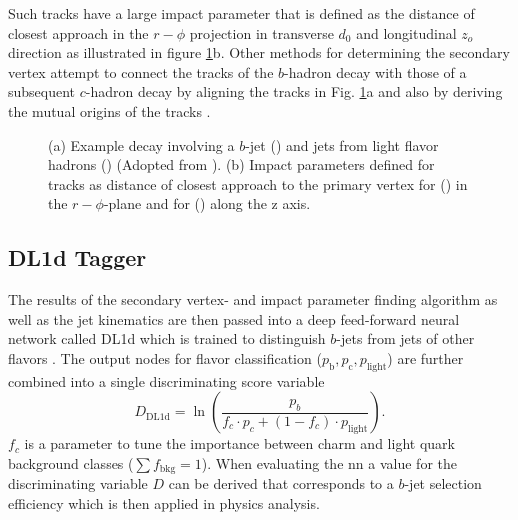 Such tracks have a large impact parameter that is defined as the distance of closest approach in the $r-\phi$ projection in transverse $d_0$ and longitudinal $z_o$ direction \citep{aad2008atlas} as illustrated in figure \ref{fig:secondary_vertex}b. Other methods for determining the secondary vertex attempt to connect the tracks of the $b$-hadron decay with those of a subsequent $c$-hadron decay by aligning the tracks in Fig. \ref{fig:secondary_vertex}a and also by deriving the mutual origins of the tracks \citep{ATL-PHYS-PUB-2017-013}.
\begin{figure}[]
  \centering
  \caption{(a) Example decay involving a $b$-jet () and jets from light flavor hadrons () (Adopted from \cite{Guth:2765038}). (b) Impact parameters defined for tracks as distance of closest approach to the primary vertex for (\mbox{\color[HTML]{009245}{$d_0$}}) in the $r-\phi$-plane and for (\mbox{\color[HTML]{EC1C25}{$z_0$}}) along the z axis.}
  \label{fig:secondary_vertex}
\end{figure}

\subsection{DL1d Tagger}
The results of the secondary vertex- and impact parameter finding algorithm as well as the jet kinematics are then passed into a deep feed-forward neural network called DL1d which is trained to distinguish $b$-jets from jets of other flavors \citep{atlas2022atlas}. The output nodes for flavor classification ($p_\mathrm{b}, p_\mathrm{c}, p_\mathrm{light}$) are further combined into a single discriminating score variable
\begin{equation}
  D_\mathrm{DL1d}=\ln\left(\frac{p_b}{f_c \cdot p_c + (1-f_c)\cdot p_\mathrm{light} }\right).
\end{equation}
$f_c$ is a parameter to tune the importance between charm and light quark background classes ($\sum f_\mathrm{bkg} =1$). When evaluating the \ac{nn} a value for the discriminating variable $D$ can be derived that corresponds to a $b$-jet selection efficiency which is then applied in physics analysis.

